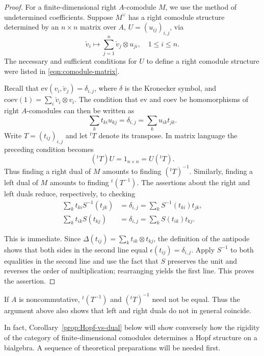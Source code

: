 \begin{proof}
	For a finite-dimensional right $A$-comodule $M$, we use the method of
	undetermined coefficients. Suppose $M^\vee$ has a right comodule structure
	determined by an $n\times n$ matrix over $A$, $U=(u_{ij})_{i,j}$, via
	\[ \check{v}_i \mapsto \sum_{j=1}^n \check{v}_j \otimes u_{ji}, \quad 1 \leq i \leq n. \]
	The necessary and sufficient conditions for $U$ to define a right comodule
	structure were listed in \eqref{eqn:comodule-matrix}.

	Recall that $\mathrm{ev}(v_i,\check v_j)=\delta_{i,j}$, where $\delta$ is
	the Kronecker symbol, and $\mathrm{coev}(1)=\sum_i\check v_i\otimes v_i$.
	The condition that $\mathrm{ev}$ and $\mathrm{coev}$ be homomorphisms of
	right $A$-comodules can then be written as
	\begin{equation}\label{eqn:Hopf-module-dual-aux}
		\sum_k t_{ki} u_{kj} = \delta_{i, j} = \sum_k u_{ik} t_{jk}.
	\end{equation}
	Write $T=(t_{ij})_{i,j}$ and let ${}^tT$ denote its transpose. In matrix
	language the preceding condition becomes
	\[ ({}^t T) U = 1_{n \times n} = U ({}^t T). \]
	Thus finding a right dual of $M$ amounts to finding $({}^tT)^{-1}$.
	Similarly, finding a left dual of $M$ amounts to finding
	${}^t(T^{-1})$. The assertions about the right and left duals reduce,
	respectively, to checking
	\begin{align*}
		\sum_k t_{ki} S^{-1}(t_{jk}) & = \delta_{i, j} = \sum_k S^{-1} (t_{ki}) t_{jk}, \\
		\sum_k t_{ik} S(t_{kj}) & = \delta_{i, j} = \sum_k S(t_{ik}) t_{kj}.
	\end{align*}

	This is immediate. Since $\Delta(t_{ij})=\sum_k t_{ik}\otimes t_{kj}$,
	the definition of the antipode shows that both sides in the second line
	equal $\epsilon(t_{ij})=\delta_{i,j}$. Apply $S^{-1}$ to both equalities in
	the second line and use the fact that $S$ preserves the unit and reverses
	the order of multiplication; rearranging yields the first line. This proves
	the assertion.
\end{proof}

If $A$ is noncommutative, ${}^t(T^{-1})$ and $({}^tT)^{-1}$ need not be
equal. Thus the argument above also shows that left and right duals do not in
general coincide.

In fact, Corollary~\ref{prop:Hopf-vs-dual} below will show conversely how the
rigidity of the category of finite-dimensional comodules determines a Hopf
structure on a bialgebra. A sequence of theoretical preparations will be
needed first.
